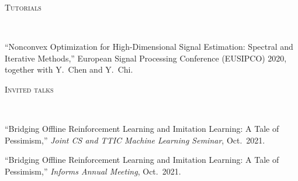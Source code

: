 \documentclass[a4paper, 10pt]{article}
\newenvironment{changemargin}[2]{%
  \begin{list}{}{%
    \setlength{\topsep}{0pt}%
    \setlength{\leftmargin}{#1}%
    \setlength{\rightmargin}{#2}%
    \setlength{\listparindent}{\parindent}%
    \setlength{\itemindent}{\parindent}%
    \setlength{\parsep}{\parskip}%
  }%
  \item[]}{\end{list}
}
\newcommand{\lineover}{
	\begin{changemargin}{-0.05in}{-0.05in}
		\vspace*{-8pt}
		\hrulefill \\
		\vspace*{-2pt}
	\end{changemargin}
}
\newcommand{\header}[1]{
	\begin{changemargin}{-0.5in}{-0.5in}
		\scshape{#1}\\
  	\lineover
	\end{changemargin}
}
\newenvironment{body} {
	\vspace*{-16pt}
	\begin{changemargin}{-0.3in}{-0.5in}
  }	
	{\end{changemargin}
}
\begin{document}
\bigskip
\header{\LARGE{Tutorials}}
\begin{body}

\vspace{18pt}
\begin{enumerate}[label={[{Tut}{{\arabic*}}]}]
\item  {``Nonconvex Optimization for High-Dimensional Signal Estimation: Spectral and Iterative Methods,''} European Signal Processing Conference (EUSIPCO) 2020, together with Y.~Chen and Y.~Chi.
\end{enumerate}

\end{body}


\bigskip
\header{\LARGE{Invited talks}}
\begin{body}
	\vspace{18pt}
	\begin{enumerate}[label={[{T}{{\arabic*}}]}]
	\item ``Bridging Offline Reinforcement Learning and Imitation Learning: A Tale of Pessimism,'' \emph{Joint CS and TTIC Machine Learning Seminar}, Oct.~2021.
	
	\item ``Bridging Offline Reinforcement Learning and Imitation Learning: A Tale of Pessimism,'' \emph{Informs Annual Meeting}, Oct.~2021.
	

\end{enumerate}
\end{body}
\end{document}
